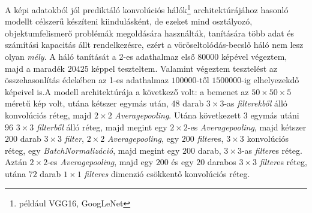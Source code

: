 \documentclass[12pt,letterpaper,oneside,openright]{book}
\begin{document}
 A képi adatokból jól prediktáló konvolúciós hálók\footnote{például VGG16, GoogLeNet} architektúrájához hasonló modellt célszerű készíteni kiindulásként, de ezeket mind osztályozó, objektumfelismerő problémák megoldására használták, tanítására több adat és számítási kapacitás állt rendelkezésre, ezért a vöröseltolódás-becslő háló nem lesz olyan \textit{mély}. A háló tanítását a 2-es adathalmaz első $\num{80000}$ képével végeztem, majd a maradék $\num{20425}$ képpel teszteltem. Valamint végeztem tesztelést az összehasonlítás édekében az 1-es adathalmaz $\num{100000}$-től $1500000$-ig elhelyezekdő képeivel is.\newline\indent A modell architektúrája a következő volt: a bemenet az $50\times50\times5$ méretű kép volt, utána kétszer egymás után, 48 darab $3\times 3$-as \textit{filterekből} álló konvolúciós réteg, majd $2\times 2$ \textit{Averagepooling}. Utána következett 3 egymás utáni $96$ $3\times3$ \textit{filterből} álló réteg, majd megint egy $2\times2$-es \textit{Averagepooling}, majd kétszer $200$ darab $3\times3$ \textit{filter}, $2\times 2$ \textit{Averagepooling}, egy $200$ \textit{filter}es, $3\times 3$ konvolúciós réteg, egy \textit{BatchNormalizáció}, majd megint egy $200$ darab, $3\times 3$-as \textit{filter}es réteg. Aztán $2\times 2$-es \textit{Averagepooling}, majd egy $200$ és egy $20$ darabos $3\times 3$ \textit{filter}es réteg, utána $72$ darab $1\times 1$ \textit{filteres} dimenzió csökkentő konvolúciós réteg.
\end{document}

